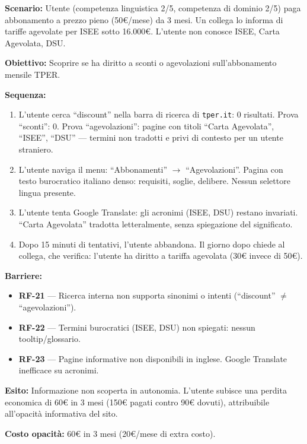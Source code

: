 ﻿\documentclass[11pt,a4paper]{article}
\begin{document}
\begin{tcolorbox}[base]
    {\small
    \textbf{Scenario:} Utente (competenza linguistica 2/5, competenza di dominio 2/5) paga abbonamento a prezzo pieno (50\euro{}/mese) da 3 mesi. Un collega lo informa di tariffe agevolate per ISEE sotto 16.000\euro{}. L'utente non conosce ISEE, Carta Agevolata, DSU.

    \textbf{Obiettivo:} Scoprire se ha diritto a sconti o agevolazioni sull'abbonamento mensile TPER.

    \textbf{Sequenza:}
    \begin{enumerate}
        \item L'utente cerca ``discount'' nella barra di ricerca di \texttt{tper.it}: 0 risultati. Prova ``sconti'': 0. Prova ``agevolazioni'': pagine con titoli ``Carta Agevolata'', ``ISEE'', ``DSU'' --- termini non tradotti e privi di contesto per un utente straniero.
        \item L'utente naviga il menu: ``Abbonamenti'' $\rightarrow$ ``Agevolazioni''. Pagina con testo burocratico italiano denso: requisiti, soglie, delibere. Nessun selettore lingua presente.
        \item L'utente tenta Google Translate: gli acronimi (ISEE, DSU) restano invariati. ``Carta Agevolata'' tradotta letteralmente, senza spiegazione del significato.
        \item Dopo 15 minuti di tentativi, l'utente abbandona. Il giorno dopo chiede al collega, che verifica: l'utente ha diritto a tariffa agevolata (30\euro{} invece di 50\euro{}).
    \end{enumerate}

    \textbf{Barriere:}
    \begin{itemize}
        \item \textbf{RF-21} --- Ricerca interna non supporta sinonimi o intenti (``discount'' $\neq$ ``agevolazioni'').
        \item \textbf{RF-22} --- Termini burocratici (ISEE, DSU) non spiegati: nessun tooltip/glossario.
        \item \textbf{RF-23} --- Pagine informative non disponibili in inglese. Google Translate inefficace su acronimi.
    \end{itemize}

    \textbf{Esito:} Informazione non scoperta in autonomia. L'utente subisce una perdita economica di 60\euro{} in 3 mesi (150\euro{} pagati contro 90\euro{} dovuti), attribuibile all'opacità informativa del sito.

    \textbf{Costo opacità:} 60\euro{} in 3 mesi (20\euro{}/mese di extra costo).
    }
\end{tcolorbox}
\end{document}
